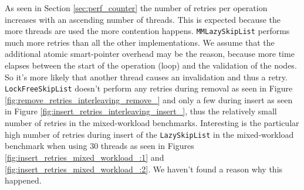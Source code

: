 \noindent As seen in Section \ref{sec:perf_counter} the number of retries per operation increases with an ascending number of threads. This is expected because the more threads are used the more contention happens. \texttt{MMLazySkipList} performs much more retries than all the other implementations. We assume that the additional atomic smart-pointer overhead may be the reason, because more time elapses between the start of the operation (loop) and the validation of the nodes. So it's more likely that another thread causes an invalidation and thus a retry. \texttt{LockFreeSkipList} doesn't perform any retries during removal as seen in Figure \ref{fig:remove_retries_interleaving_remove_} and only a few during insert as seen in Figure \ref{fig:insert_retries_interleaving_insert_}, thus the relatively small number of retries in the mixed-workload benchmarks. Interesting is the particular high number of retries during insert of the \texttt{LazySkipList} in the mixed-workload benchmark when using $30$ threads as seen in Figures \ref{fig:insert_retries_mixed_workload_:1} and \ref{fig:insert_retries_mixed_workload_:2}. We haven't found a reason why this happened.


